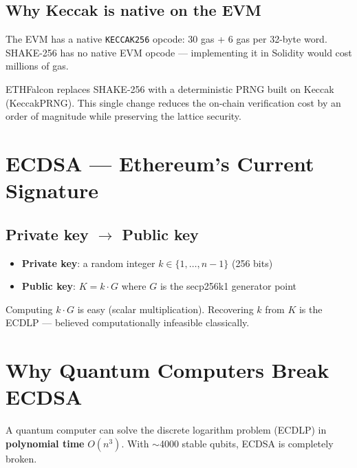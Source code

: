 \documentclass[11pt,a4paper]{article}
\begin{document}
\subsection{Why Keccak is native on the EVM}

The EVM has a native \texttt{KECCAK256} opcode: 30 gas + 6 gas per 32-byte word. SHAKE-256 has no native EVM opcode --- implementing it in Solidity would cost millions of gas.

\begin{resultbox}
ETHFalcon replaces SHAKE-256 with a deterministic PRNG built on Keccak (KeccakPRNG). This single change reduces the on-chain verification cost by an order of magnitude while preserving the lattice security.
\end{resultbox}

\section{ECDSA --- Ethereum's Current Signature}

\subsection{Private key $\to$ Public key}

\begin{itemize}
  \item \textbf{Private key}: a random integer $k \in \{1, \ldots, n-1\}$ (256 bits)
  \item \textbf{Public key}: $K = k \cdot G$ where $G$ is the secp256k1 generator point
\end{itemize}

Computing $k \cdot G$ is easy (scalar multiplication). Recovering $k$ from $K$ is the ECDLP --- believed computationally infeasible classically.

\section{Why Quantum Computers Break ECDSA}

\begin{warningbox}
A quantum computer can solve the discrete logarithm problem (ECDLP) in \textbf{polynomial time} $O(n^3)$. With $\sim$4000 stable qubits, ECDSA is completely broken.
\end{warningbox}
\end{document}
